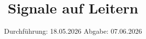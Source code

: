 

\subject{V52}
\title{Signale auf Leitern}
\date{%
  Durchführung: 18.05.2026
  \hspace{3em}
  Abgabe: 07.06.2026
}




\maketitle
\thispagestyle{empty}
\tableofcontents
\newpage






 

\printbibliography{}



